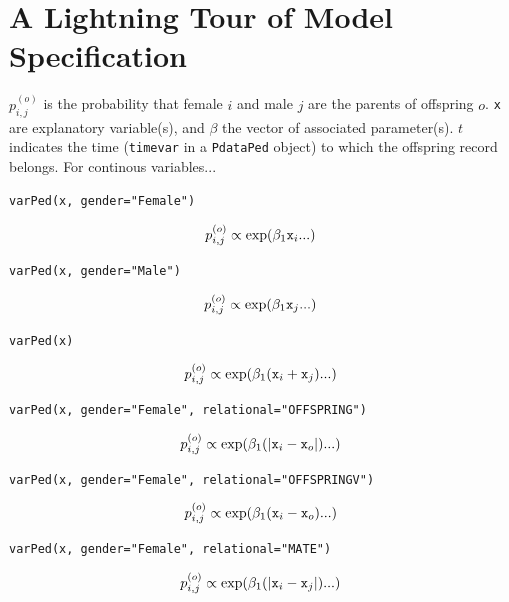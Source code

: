 \documentclass{article}
\begin{document}
\newpage
\appendix
\section{A Lightning Tour of Model Specification}
\label{models-app}

$p^{(o)}_{i,j}$ is the probability that female $i$ and male $j$ are the parents of offspring $o$. \texttt{x} are explanatory variable(s), and $\beta$ the vector of associated parameter(s). $t$ indicates the time (\texttt{timevar} in a \texttt{PdataPed} object) to which the offspring record belongs.  For continous variables...

\texttt{varPed(x, gender="Female")}

\begin{equation}
p^{(o)}_{i,j} \propto \textrm{exp}(\beta_{1}\textrm{\texttt{x}}_{i}...)
\end{equation}

\texttt{varPed(x, gender="Male")}

\begin{equation}
p^{(o)}_{i,j} \propto \textrm{exp}(\beta_{1}\textrm{\texttt{x}}_{j}...)
\end{equation}

\texttt{varPed(x)}

\begin{equation}
p^{(o)}_{i,j} \propto \textrm{exp}(\beta_{1}(\textrm{\texttt{x}}_{i}+\textrm{\texttt{x}}_{j})...)
\end{equation}

\texttt{varPed(x, gender="Female", relational="OFFSPRING")}

\begin{equation}
p^{(o)}_{i,j} \propto \textrm{exp}(\beta_{1}(|\textrm{\texttt{x}}_{i}-\textrm{\texttt{x}}_{o}|)...)
\end{equation}

\texttt{varPed(x, gender="Female", relational="OFFSPRINGV")}

\begin{equation}
p^{(o)}_{i,j} \propto \textrm{exp}(\beta_{1}(\textrm{\texttt{x}}_{i}-\textrm{\texttt{x}}_{o})...)
\end{equation}

\texttt{varPed(x, gender="Female", relational="MATE")}

\begin{equation}
p^{(o)}_{i,j} \propto \textrm{exp}(\beta_{1}(|\textrm{\texttt{x}}_{i}-\textrm{\texttt{x}}_{j}|)...)
\end{equation}
\end{document}
